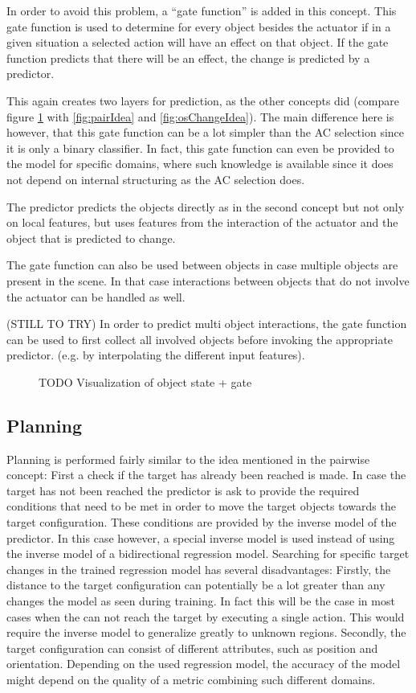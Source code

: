 In order to avoid this problem, a \enquote{gate function} is added in this concept. This gate function is used to determine for 
every object besides the actuator if in a given situation a selected action will have an effect on that object.
If the gate function predicts that there will be an effect, the change is predicted by a predictor.

This again creates two layers for prediction, as the other concepts did (compare figure \ref{fig:osGateIdea} with \ref{fig:pairIdea} and \ref{fig:osChangeIdea}). 
The main difference here is however, that this gate function
can be a lot simpler than the AC selection since it is only a binary classifier. In fact, this gate function can even be provided
to the model for specific domains, where such knowledge is available since it does not depend on internal structuring as the AC selection does.

The predictor predicts the objects directly as in the second concept but not only on local features, but uses features from the interaction
of the actuator and the object that is predicted to change. 

The gate function can also be used between objects in case multiple objects are present in the scene. In that case interactions between
objects that do not involve the actuator can be handled as well.

(STILL TO TRY) In order to predict multi object interactions, the gate function can be used to first collect all involved objects before
invoking the appropriate predictor. (e.g. by interpolating the different input features).


\begin{figure}
\caption{TODO Visualization of object state + gate}
\label{fig:osGateIdea}
\end{figure}

\subsection{Planning}

Planning is performed fairly similar to the idea mentioned in the pairwise concept: First a check if the target has already been reached is made.
In case the target has not been reached the predictor is ask to provide the required conditions that need to be met in order to move the target objects towards the target
configuration. These conditions are provided by the inverse model of the predictor.
In this case however, a special inverse model is used instead of using the inverse model of a bidirectional regression model. Searching for specific target changes in the
trained regression model has several disadvantages: Firstly, the distance to the target configuration can potentially be a lot greater than any changes the model as seen during training.
In fact this will be the case in most cases when the can not reach the target by executing a single action. This would require the inverse model to generalize greatly to unknown regions.
Secondly, the target configuration can consist of different attributes, such as position and orientation. Depending on the used regression model, the accuracy of the model might depend on the quality of a metric combining such different domains.

